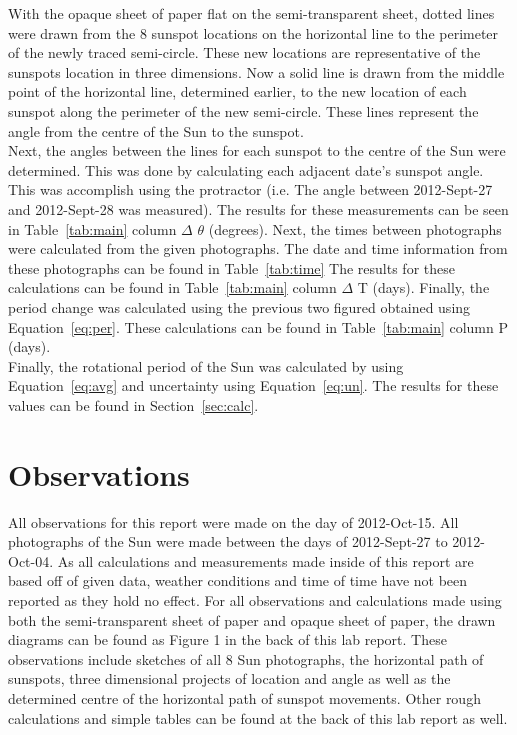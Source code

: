 \documentclass{article}
\begin{document}
With the opaque sheet of paper flat on the semi-transparent sheet, dotted lines were drawn from the 8 sunspot locations
on the horizontal line to the perimeter of the newly traced semi-circle. These new locations are representative of the 
sunspots location in three dimensions. Now a solid line is drawn from the middle point of the horizontal line, determined
earlier, to the new location of each sunspot along the perimeter of the new semi-circle. These lines represent the angle
from the centre of the Sun to the sunspot.\\

Next, the angles between the lines for each sunspot to the centre of the Sun were determined. This was done by calculating
each adjacent date's sunspot angle. This was accomplish using the protractor (i.e. The angle between 2012-Sept-27 and 
2012-Sept-28 was measured). The results for these measurements can be seen in Table~\ref{tab:main} column 
$\Delta$ $\theta$ (degrees). Next, the times between photographs were calculated from the given photographs. The date
and time information from these photographs can be found in Table~\ref{tab:time} The results
for these calculations can be found in Table~\ref{tab:main} column $\Delta$ T (days). Finally, the period change was calculated
using the previous two figured obtained using Equation~\ref{eq:per}. These calculations can be found in Table~\ref{tab:main} column 
P (days).\\

Finally, the rotational period of the Sun was calculated by using Equation~\ref{eq:avg} and uncertainty using Equation~\ref{eq:un}.
The results for these values can be found in Section~\ref{sec:calc}.



\section{Observations}

All observations for this report were made on the day of 2012-Oct-15. All photographs of the Sun were made between the
days of 2012-Sept-27 to 2012-Oct-04. As all calculations and measurements made inside of this report are based off of
given data, weather conditions and time of time have not been reported as they hold no effect. For all observations and
calculations made using both the semi-transparent sheet of paper and opaque sheet of paper, the drawn diagrams
can be found as Figure 1 in the back of this lab report. These observations include sketches of all 8 Sun photographs, 
the horizontal path of sunspots, three dimensional projects of location and angle as well as the determined centre of
the horizontal path of sunspot movements. Other rough calculations and simple tables can be found at the back
of this lab report as well.
\end{document}
